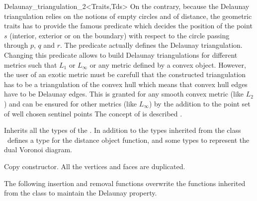 \begin{ccRefClass}{Delaunay_triangulation_2<Traits,Tds>}
On the contrary, because the
Delaunay triangulation relies on the notions of 
empty circles and of distance, the geometric traits
 has to provide the famous  predicate
which decides the position of  the point $s$ (interior, exterior
or on the boundary) with respect to the circle
passing through $p$, $q$ and $r$. The 
predicate actually defines the Delaunay triangulation.
Changing this predicate 
allows to build Delaunay triangulations for different metrics
such that $L_1$ or $L_{\infty}$ or any metric defined by a
convex object. However, the user of an exotic metric
must be carefull that the constructed triangulation 
has to be a triangulation of the convex hull
which means that convex hull edges have to be Delaunay edges.
This is granted for any smooth convex metric (like $L_2$)
and can be ensured for other metrics (like  $L_{\infty}$)
by the addition to the point set of well chosen sentinel points
The concept of  is  described
.



\ccInheritsFrom


\ccTypes
Inherits all the types of the .
In addition to the types inherited from 
the class \ccClassTemplateName\
defines a type for the distance object function, and 
some types to
represent the dual Voronoi diagram.


\ccGlue
{}
\ccGlue
{}



\ccCreation
{}  %


{Copy constructor. All the vertices and faces are duplicated.}


The following insertion and removal  functions overwrite
the functions inherited from the class
 to maintain the Delaunay property.





\end{ccRefClass}
